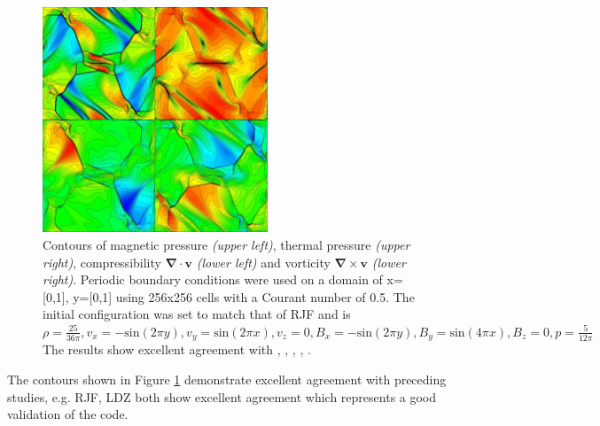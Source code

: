\begin{figure}[t]
\centering
\includegraphics[width=0.6\textwidth]{orszag}
\caption{
Contours of magnetic pressure {\it(upper left)}, thermal pressure {\it(upper right)}, compressibility $\boldsymbol{\nabla} \cdot \mathbf{v}$ {\it(lower left)} and vorticity $\boldsymbol{\nabla} \times \mathbf{v}$ {\it(lower right)}.
Periodic boundary conditions were used on a domain of x=[0,1], y=[0,1] using 256x256 cells with a Courant number of 0.5.
The initial configuration was set to match that of RJF and is 
$ \rho = \frac{25}{36\pi} ,
v_x = -\mathrm{sin}(2\pi y),
v_y = \mathrm{sin}(2\pi x),
v_z = 0,
B_x = -\mathrm{sin}(2\pi y),
B_y = \mathrm{sin}(4\pi x),
B_z = 0,
p = \frac{5}{12\pi} $
The results show excellent agreement with 
\cite{2000ApJ...530..508L}, \citet{1999osullivan}, \cite{1998ApJ...494..317D}, \cite{1998ApJ...509..244R}, \citet{1995ApJ...452..785R}.
}
\label{fig:3-8} %
\end{figure}

The contours shown in Figure \ref{fig:3-8} demonstrate excellent agreement with preceding studies, e.g. RJF, LDZ both show excellent agreement which represents a good validation of the code. 

